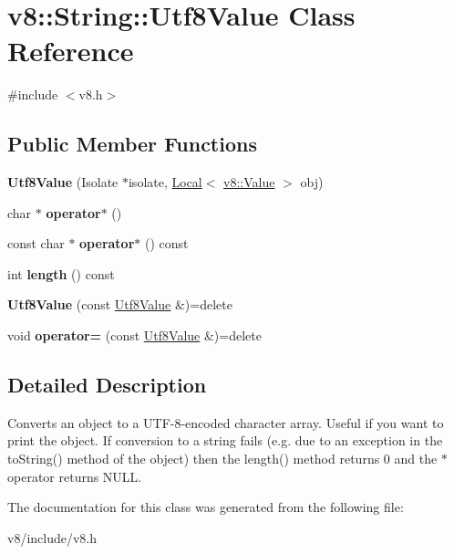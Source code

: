 \hypertarget{classv8_1_1String_1_1Utf8Value}{}\section{v8\+:\+:String\+:\+:Utf8\+Value Class Reference}
\label{classv8_1_1String_1_1Utf8Value}


{\ttfamily \#include $<$v8.\+h$>$}

\subsection*{Public Member Functions}
\begin{DoxyCompactItemize}
\item 
\mbox{\label{classv8_1_1String_1_1Utf8Value_a6dd031d0040e83fc7ffc4b4a1c990654}} 
{\bfseries Utf8\+Value} (Isolate $\ast$isolate, \mbox{\hyperlink{classv8_1_1Local}{Local}}$<$ \mbox{\hyperlink{classv8_1_1Value}{v8\+::\+Value}} $>$ obj)
\item 
\mbox{\label{classv8_1_1String_1_1Utf8Value_a6cb4914bc426bbe60b0dfdff32213e59}} 
char $\ast$ {\bfseries operator$\ast$} ()
\item 
\mbox{\label{classv8_1_1String_1_1Utf8Value_af482ca665c7b8f84a1ba148b8be8f36e}} 
const char $\ast$ {\bfseries operator$\ast$} () const
\item 
\mbox{\label{classv8_1_1String_1_1Utf8Value_acf903e28f4aa775e3dbe3a73161fdcbc}} 
int {\bfseries length} () const
\item 
\mbox{\label{classv8_1_1String_1_1Utf8Value_a8a9d1b3ccc59550ecb288eea858dc060}} 
{\bfseries Utf8\+Value} (const \mbox{\hyperlink{classv8_1_1String_1_1Utf8Value}{Utf8\+Value}} \&)=delete
\item 
\mbox{\label{classv8_1_1String_1_1Utf8Value_abb5e79454b29d2b43eeab50baeff377b}} 
void {\bfseries operator=} (const \mbox{\hyperlink{classv8_1_1String_1_1Utf8Value}{Utf8\+Value}} \&)=delete
\end{DoxyCompactItemize}


\subsection{Detailed Description}
Converts an object to a U\+T\+F-\/8-\/encoded character array. Useful if you want to print the object. If conversion to a string fails (e.\+g. due to an exception in the to\+String() method of the object) then the length() method returns 0 and the $\ast$ operator returns N\+U\+LL. 

The documentation for this class was generated from the following file\+:\begin{DoxyCompactItemize}
\item 
v8/include/v8.\+h\end{DoxyCompactItemize}
